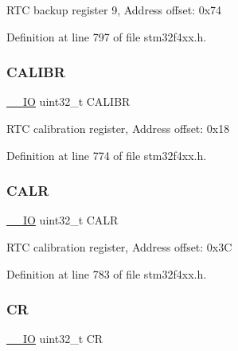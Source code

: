 R\+TC backup register 9, Address offset\+: 0x74 

Definition at line 797 of file stm32f4xx.\+h.

\mbox{\label{struct_r_t_c___type_def_ab97f3e9584dda705dc10a5f4c5f6e636}} 
\subsubsection{\texorpdfstring{C\+A\+L\+I\+BR}{CALIBR}}
{\footnotesize\ttfamily \hyperlink{group___c_m_s_i_s__core__definitions_gaec43007d9998a0a0e01faede4133d6be}{\+\_\+\+\_\+\+IO} uint32\+\_\+t C\+A\+L\+I\+BR}

R\+TC calibration register, Address offset\+: 0x18 

Definition at line 774 of file stm32f4xx.\+h.

\mbox{\label{struct_r_t_c___type_def_a2ce7c3842792c506635bb87a21588b58}} 
\subsubsection{\texorpdfstring{C\+A\+LR}{CALR}}
{\footnotesize\ttfamily \hyperlink{group___c_m_s_i_s__core__definitions_gaec43007d9998a0a0e01faede4133d6be}{\+\_\+\+\_\+\+IO} uint32\+\_\+t C\+A\+LR}

R\+TC calibration register, Address offset\+: 0x3C 

Definition at line 783 of file stm32f4xx.\+h.

\mbox{\label{struct_r_t_c___type_def_ab40c89c59391aaa9d9a8ec011dd0907a}} 
\subsubsection{\texorpdfstring{CR}{CR}}
{\footnotesize\ttfamily \hyperlink{group___c_m_s_i_s__core__definitions_gaec43007d9998a0a0e01faede4133d6be}{\+\_\+\+\_\+\+IO} uint32\+\_\+t CR}

